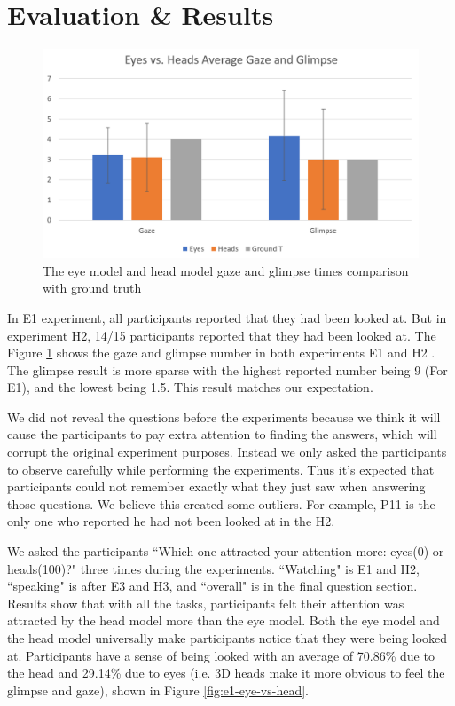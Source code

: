 \section{Evaluation \& Results}

\begin{figure}
	\centering
 	\includegraphics[width=\textwidth]{Result_F1.png}
	\caption{The eye model and head model gaze and glimpse times comparison with ground truth}
	\label{fig:e1-ga}
\end{figure}

In E1 experiment, all participants reported that they had been looked at. But in experiment H2, 14/15 participants reported that they had been looked at. The Figure \ref{fig:e1-ga} shows the gaze and glimpse number in both experiments E1 and H2 . The glimpse result is more sparse with the highest reported number being 9 (For E1), and the lowest being 1.5. This result matches our expectation. 

We did not reveal the questions before the experiments because we think it will cause the participants to pay extra attention to finding the answers, which will corrupt the original experiment purposes. Instead we only asked the participants to observe carefully while performing the experiments. Thus it’s expected that participants could not remember exactly what they just saw when answering those questions. We believe this created some outliers. For example, P11 is the only one who reported he had not been looked at in the H2.

We asked the participants ``Which one attracted your attention more: eyes(0) or heads(100)?" three times during the experiments. ``Watching" is E1 and H2, ``speaking" is after E3 and H3, and ``overall" is in the final question section. Results show that with all the tasks, participants felt their attention was attracted by the head model more than the eye model. Both the eye model and the head model universally make participants notice that they were being looked at. Participants have a sense of being looked with an average of 70.86\% due to the head and 29.14\% due to eyes (i.e. 3D heads make it more obvious to feel the glimpse and gaze), shown in Figure \ref{fig:e1-eye-vs-head}. 

